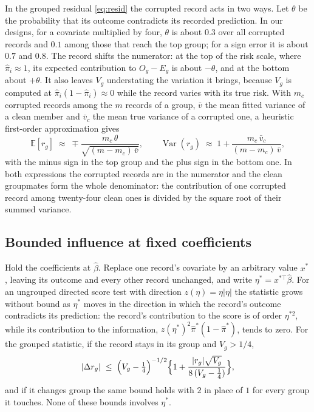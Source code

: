 In the grouped residual \eqref{eq:resid} the corrupted record acts in two ways. Let $\theta$ be the
probability that its outcome contradicts its recorded prediction. In our designs, for a covariate
multiplied by four, $\theta$ is about $0.3$ over all corrupted records and $0.1$ among those that reach
the top group; for a sign error it is about $0.7$ and $0.8$. The record shifts the
numerator: at the top of the risk scale, where $\hat\pi_i\approx1$, its expected contribution to
$O_g-E_g$ is about $-\theta$, and at the bottom about $+\theta$. It also leaves $V_g$ understating the
variation it brings, because $V_g$ is computed at $\hat\pi_i(1-\hat\pi_i)\approx0$ while the record
varies with its true risk. With $m_c$ corrupted records among the $m$ records of a group, $\bar v$ the
mean fitted variance of a clean member and $\bar v_c$ the mean true variance of a corrupted one, a
heuristic first-order approximation gives
\begin{equation}\label{eq:twomoments}
  \mathbb{E}[r_g]\;\approx\;\mp\frac{m_c\,\theta}{\sqrt{(m-m_c)\,\bar v}},
  \qquad
  \operatorname{Var}(r_g)\;\approx\;1+\frac{m_c\,\bar v_c}{(m-m_c)\,\bar v},
\end{equation}
with the minus sign in the top group and the plus sign in the bottom one. In both expressions the
corrupted records are in the numerator and the clean groupmates form the whole denominator: the
contribution of one corrupted record among twenty-four clean ones is divided by the square root of
their summed variance.

\subsection{Bounded influence at fixed coefficients}

\begin{proposition}\label{prop:bounded}
Hold the coefficients at $\hat\beta$. Replace one record's covariate by an arbitrary value $x^{*}$,
leaving its outcome and every other record unchanged, and write $\eta^{*}=x^{*\top}\hat\beta$. For an
ungrouped directed score test with direction $z(\eta)=\eta|\eta|$ the statistic grows without bound as
$\eta^{*}$ moves in the direction in which the record's outcome contradicts its prediction: the record's contribution to the score is of order $\eta^{*2}$, while its contribution to
the information, $z(\eta^{*})^{2}\hat\pi^{*}(1-\hat\pi^{*})$, tends to zero. For the grouped statistic,
if the record stays in its group and $V_g>1/4$,
\[
  |\Delta r_g|\;\le\;\Bigl(V_g-\tfrac14\Bigr)^{-1/2}
  \Bigl\{1+\frac{|r_g|\sqrt{V_g}}{8\,(V_g-\frac14)}\Bigr\},
\]
and if it changes group the same bound holds with $2$ in place of $1$ for every group it touches.
None of these bounds involves $\eta^{*}$.
\end{proposition}

